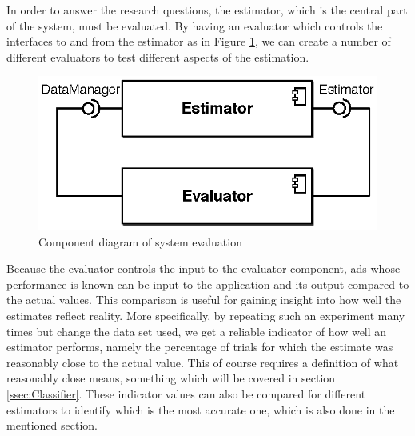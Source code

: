 \documentclass{sig-alternate}
\begin{document}
In order to answer the research questions, the estimator, which is the central part of the system, must be evaluated. By having an evaluator which controls the interfaces to and from the estimator as in Figure \ref{fig:SWEvaluator}, we can create a number of different evaluators to test different aspects of the estimation.

\begin{figure}[htpb]
	\centering
	\includegraphics[width=0.65\columnwidth]{sw-evaluator.eps}
	\caption{Component diagram of system evaluation}
	\label{fig:SWEvaluator}
\end{figure}

Because the evaluator controls the input to the evaluator component, ads whose performance is known can be input to the application and its output compared to the actual values. This comparison is useful for gaining insight into how well the estimates reflect reality. More specifically, by repeating such an experiment many times but change the data set used, we get a reliable indicator of how well an estimator performs, namely the percentage of trials for which the estimate was reasonably close to the actual value. This of course requires a definition of what reasonably close means, something which will be covered in section \ref{ssec:Classifier}. These indicator values can also be compared for different estimators to identify which is the most accurate one, which is also done in the mentioned section.
\end{document}

